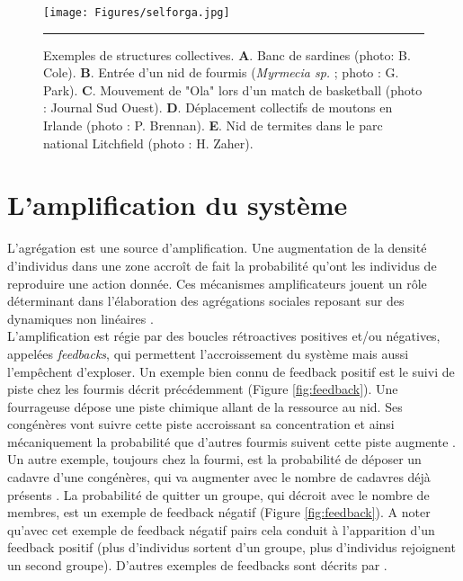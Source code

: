  \begin{figure}[ht]
	\centering
		\texttt{[image: Figures/selforga.jpg]}
		\rule{35em}{0.5pt}
	\caption[Selforga]{Exemples de structures collectives. \textbf{A}. Banc de sardines (photo: B. Cole). \textbf{B}. Entrée d'un nid de fourmis (\textit{Myrmecia sp.} ; photo : G. Park). \textbf{C}. Mouvement de "Ola" lors d'un match de basketball (photo : Journal Sud Ouest). \textbf{D}. Déplacement collectifs de moutons en Irlande (photo : P. Brennan). \textbf{E}. Nid de termites dans le parc national Litchfield (photo : H. Zaher).}
	\label{fig:selforga}

\end{figure}


	\section{L'amplification du système}
    \label{sec:amplification}

L'agrégation est une source d'amplification. Une augmentation de la densité d'individus dans une zone accroît de fait la probabilité qu'ont les individus de reproduire une action donnée. Ces mécanismes amplificateurs jouent un rôle déterminant dans l'élaboration des agrégations sociales reposant sur des dynamiques non linéaires \citep{camazine_self-organization_2001, deneubourg_dynamics_2002}.\\  
L'amplification est régie par des boucles rétroactives positives et/ou négatives, appelées \textit{feedbacks}, qui permettent l'accroissement du système mais aussi l'empêchent d'exploser. Un exemple bien connu de feedback positif est le suivi de piste chez les fourmis décrit précédemment (Figure \ref{fig:feedback}). Une fourrageuse dépose une piste chimique allant de la ressource au nid. Ses congénères vont suivre cette piste accroissant sa concentration et ainsi mécaniquement la probabilité que d'autres fourmis suivent cette piste augmente \cite{dussutour_organisation_2004}. Un autre exemple, toujours chez la fourmi, est la probabilité de déposer un cadavre d'une congénères, qui va augmenter avec le nombre de cadavres déjà présents \cite{deneubourg_collective_1989}. La probabilité de quitter un groupe, qui décroit avec le nombre de membres, est un exemple de feedback négatif (Figure \ref{fig:feedback}). A noter qu'avec cet exemple de feedback négatif pairs cela conduit à l'apparition d'un feedback positif (plus d'individus sortent d'un groupe, plus d'individus rejoignent un second groupe). D'autres exemples de feedbacks sont décrits par \citet{jeanson_positive_2009}.\\




